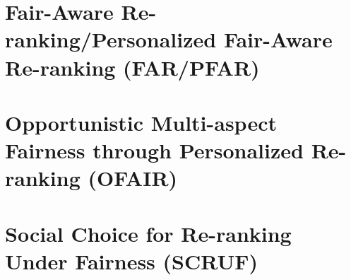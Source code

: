 \section{Fair-Aware Re-ranking/Personalized Fair-Aware Re-ranking (FAR/PFAR)}
    
    \clearpage
    

\section{Opportunistic Multi-aspect Fairness through Personalized Re-ranking (OFAIR)}
    
    \clearpage
\section{Social Choice for Re-ranking Under Fairness (SCRUF)}
    
    

